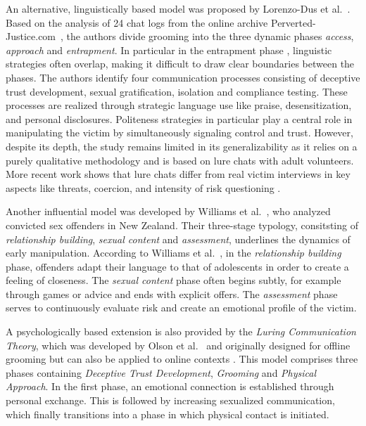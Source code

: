 An alternative, linguistically based model was proposed by Lorenzo-Dus et al.~\cite{lorenzo2016understanding}. Based on the analysis of 24 chat logs from the online archive Perverted-Justice.com~\cite{pj}, the authors divide grooming into the three dynamic phases \emph{access}, \emph{approach} and \emph{entrapment}. In particular in the entrapment phase , linguistic strategies often overlap, making it difficult to draw clear boundaries between the phases. The authors identify four communication processes consisting of deceptive trust development, sexual gratification, isolation and compliance testing. These processes are realized through strategic language use like praise, desensitization, and personal disclosures. Politeness strategies in particular play a central role in manipulating the victim by simultaneously signaling control and trust. However, despite its depth, the study remains limited in its generalizability as it relies on a purely qualitative methodology and is based on lure chats with adult volunteers. More recent work shows that lure chats differ from real victim interviews in key aspects like threats, coercion, and intensity of risk questioning \parencite{Ringenberg2024assessing}.  %

Another influential model was developed by Williams et al.~\cite{williamsmodel}, who analyzed convicted sex offenders in New Zealand. Their three-stage typology, consitsting of \emph{relationship building}, \emph{sexual content} and \emph{assessment}, underlines the dynamics of early manipulation. According to Williams et al.~\cite{williamsmodel}, in the \emph{relationship building} phase, offenders adapt their language to that of adolescents in order to create a feeling of closeness. The \emph{sexual content} phase often begins subtly, for example through games or advice and ends with explicit offers. The \emph{assessment} phase serves to continuously evaluate risk and create an emotional profile of the victim.

A psychologically based extension is also provided by the \emph{Luring Communication Theory}, which was developed by Olson et al.~\cite{olsonluring2007} and originally designed for offline grooming but can also be applied to online contexts \parencite{Cano2014}. This model comprises three phases containing \emph{Deceptive Trust Development}, \emph{Grooming} and \emph{Physical Approach}. In the first phase, an emotional connection is established through personal exchange. This is followed by increasing sexualized communication, which finally transitions into a phase in which physical contact is initiated.

